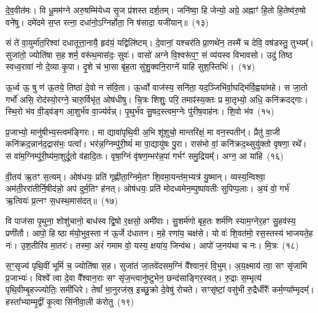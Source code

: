 दे॒व॒वीत॑मः। वि धू॒मम॑ग्ने अरु॒षम्मि॑येध्य सृ॒ज प्र॑शस्त दर्\mbox{}श॒तम्। जनि॑ष्वा॒ हि जेन्यो॒ अग्रे॒ अह्नाꣳ॑ हि॒तो हि॒तेष्व॑रु॒षो वने॑षु। दमे॑दमे स॒प्त रत्ना॒ दधा॑नो॒\-ऽग्निर्\mbox{}होता॒ नि ष॑सादा॒ यजी॑यान्॥~(१३)

{\anuvakamend[{स्थ॒ ई॒धे॒ शोच॑स्व स॒प्तविꣳ॑शतिश्च}]}%

सं ते॑ वा॒युर्मा॑त॒रिश्वा॑ दधातूत्ता॒नायै॒ हृद॑यं॒ यद्विलि॑ष्टम्। दे॒वानां॒ यश्चर॑ति प्रा॒णथे॑न॒ तस्मै॑ च देवि॒ वष॑डस्तु॒ तुभ्यम्᳚। सुजा॑तो॒ ज्योति॑षा स॒ह शर्म॒ वरू॑थ॒मास॑दः॒ सुवः॑। वासो॑ अग्ने वि॒श्वरू॑प॒ꣳ॒ सं व्य॑यस्व विभावसो। उदु॑ तिष्ठ स्वध्व॒रावा॑ नो दे॒व्या कृ॒पा। दृ॒शे च॑ भा॒सा बृ॑ह॒ता सु॑शु॒क्वनि॒राग्ने॑ याहि सुश॒स्तिभिः॑।~(१४)

ऊ॒र्ध्व ऊ॒ षु ण॑ ऊ॒तये॒ तिष्ठा॑ दे॒वो न स॑वि॒ता। ऊ॒र्ध्वो वाज॑स्य॒ सनि॑ता॒ यद॒ञ्जिभि॑र्वा॒घद्भि॑र्वि॒ह्वया॑महे। स जा॒तो गर्भो॑ असि॒ रोद॑स्यो॒रग्ने॒ चारु॒र्विभृ॑त॒ ओष॑धीषु। चि॒त्रः शिशुः॒ परि॒ तमाꣴ॑स्य॒क्तः प्र मा॒तृभ्यो॒ अधि॒ कनि॑क्रदद्गाः। स्थि॒रो भ॑व वी॒ड्व॑ङ्ग आ॒शुर्भ॑व वा॒ज्य॑र्वन्न्। पृ॒थुर्भ॑व सु॒षद॒स्त्वम॒ग्नेः पु॑रीष॒वाह॑नः। शि॒वो भ॑व~(१५)

प्र॒जाभ्यो॒ मानु॑षीभ्य॒स्त्वम॑ङ्गिरः। मा द्यावा॑पृथि॒वी अ॒भि शू॑शुचो॒ मान्तरि॑क्षं॒ मा वन॒स्पतीन्॑। प्रैतु॑ वा॒जी कनि॑क्रद॒न्नान॑द॒द्रास॑भः॒ पत्वा᳚। भर॑न्न॒ग्निम्पु॑री॒ष्यं॑ मा पा॒द्यायु॑षः पु॒रा। रास॑भो वां॒ कनि॑क्रद॒थ्सुयु॑क्तो वृषणा॒ रथे᳚। स वा॑म॒ग्निम्पु॑री॒ष्य॑मा॒शुर्दू॒तो व॑हादि॒तः। वृषा॒ग्निं वृ॑षण॒म्भर॑न्न॒पां गर्भꣳ॑ समु॒द्रियम्᳚। अग्न॒ आ या॑हि~(१६)

वी॒तय॑ ऋ॒तꣳ स॒त्यम्। ओष॑धयः॒ प्रति॑ गृह्णीता॒ग्निमे॒तꣳ शि॒वमा॒यन्त॑म॒भ्यत्र॑ यु॒ष्मान्। व्यस्य॒न्विश्वा॒ अम॑ती॒ररा॑तीर्नि॒षीद॑न्नो॒ अप॑ दुर्म॒तिꣳ ह॑नत्। ओष॑धयः॒ प्रति॑ मोदध्वमेन॒म्पुष्पा॑वतीः सुपिप्प॒लाः। अ॒यं वो॒ गर्भ॑ ऋ॒त्वियः॑ प्र॒त्नꣳ स॒धस्थ॒मास॑दत्॥~(१७)

{\anuvakamend[{सु॒श॒स्तिभिः॑ शि॒वो भ॑व याहि॒ षट्त्रिꣳ॑शच्च}]}%

वि पाज॑सा पृ॒थुना॒ शोशु॑चानो॒ बाध॑स्व द्वि॒षो र॒क्षसो॒ अमी॑वाः। सु॒शर्म॑णो बृह॒तः शर्म॑णि स्याम॒ग्नेर॒हꣳ सु॒हव॑स्य॒ प्रणी॑तौ। आपो॒ हि ष्ठा म॑यो॒भुव॒स्ता न॑ ऊ॒र्जे द॑धातन। म॒हे रणा॑य॒ चक्ष॑से। यो वः॑ शि॒वत॑मो॒ रस॒स्तस्य॑ भाजयते॒ह नः॑। उ॒श॒तीरि॑व मा॒तरः॑। तस्मा॒ अरं॑ गमाम वो॒ यस्य॒ क्षया॑य॒ जिन्व॑थ। आपो॑ ज॒नय॑था च नः। मि॒त्रः~(१८)

स॒ꣳ॒सृज्य॑ पृथि॒वीं भूमिं॑ च॒ ज्योति॑षा स॒ह। सुजा॑तं जा॒तवे॑दसम॒ग्निं वै᳚श्वान॒रं वि॒भुम्। अ॒य॒क्ष्माय॑ त्वा॒ सꣳ सृ॑जामि प्र॒जाभ्यः॑। विश्वे᳚ त्वा दे॒वा वै᳚श्वान॒राः सꣳ सृ॑ज॒न्त्वानु॑ष्टुभेन॒ छन्द॑साङ्गिर॒स्वत्। रु॒द्राः स॒म्भृत्य॑ पृथि॒वीम्बृ॒हज्ज्योतिः॒ समी॑धिरे। तेषां᳚ भा॒नुरज॑स्र॒ इच्छु॒क्रो दे॒वेषु॑ रोचते। सꣳसृ॑ष्टां॒ वसु॑भी रु॒द्रैर्धीरैः᳚ कर्म॒ण्या᳚म्मृदम्᳚। हस्ता᳚भ्याम्मृ॒द्वीं कृ॒त्वा सि॑नीवा॒ली क॑रोतु~(१९)


